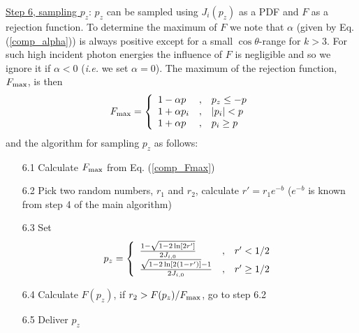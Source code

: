 \underline{Step 6, sampling $p_z$}: 
$p_z$ can be sampled using $J_i(p_z)$ as a PDF and $F$ as a rejection 
function. To determine the maximum of $F$ we note that $\alpha$ 
(given by Eq. (\ref{comp_alpha})) is always positive except for  
a small $\cos \theta$-range for $k > 3$. For such high incident 
photon energies the influence of $F$ is negligible and so 
we ignore it if $\alpha < 0$ ({\em i.e.} we set $\alpha = 0$).
The maximum of the rejection function, $F_{\rm max}$, is then
\begin{equation}
F_{\rm max} =   
\label{comp_Fmax}
 \left\{
\begin{array}{l@{\quad , \quad}l}
1 - \alpha p & p_z \le -p \\
1 + \alpha p_i & |p_i| < p \\
1 + \alpha p & p_i \ge p 
\end{array} \right.
\end{equation}
and the algorithm for sampling $p_z$ as follows:
\begin{itemize}  
\item[6.1]
Calculate $F_{\rm max}$ from Eq. (\ref{comp_Fmax})
\item[6.2]
Pick two random numbers, $r_1$ and $r_2$, calculate $r' = r_1 e^{-b}$ 
($e^{-b}$ is known from step 4 of the main algorithm)
\item[6.3]
Set 
\begin{equation}
p_z = \left\{ \begin{array}{l@{\quad , \quad}l} 
{1 - \sqrt{1 - 2 \ln [2 r']} \over 2 J_{i,0}} & r' < 1/2 \\
{\sqrt{1 - 2 \ln [2(1-r')]} - 1 \over 2 J_{i,0}} & r' \ge 1/2 
\end{array} \right.
\end{equation}
\item[6.4]
Calculate $F(p_z)$, if $r_2 > F(p_z)/F_{\rm max}$, go to step 6.2
\item[6.5]
Deliver $p_z$
\end{itemize}  
 
